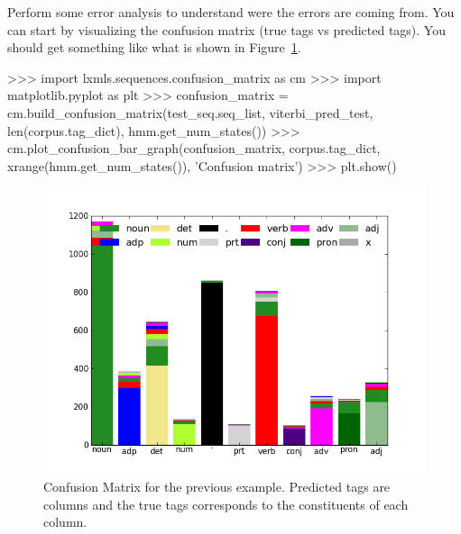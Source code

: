 \begin{exercise}
Perform some error analysis to understand were the errors are coming
from. You can start by visualizing the confusion matrix (true tags vs
predicted tags). You should get something like what is shown in Figure~\ref{fig:cmuns}.

\begin{python}
>>> import lxmls.sequences.confusion_matrix as cm
>>> import matplotlib.pyplot as plt
>>> confusion_matrix = cm.build_confusion_matrix(test_seq.seq_list, viterbi_pred_test, len(corpus.tag_dict), hmm.get_num_states())
>>> cm.plot_confusion_bar_graph(confusion_matrix, corpus.tag_dict, xrange(hmm.get_num_states()), 'Confusion matrix')
>>> plt.show()
\end{python}

\begin{figure}[h!]
\centering
\includegraphics[scale=.4]{figs/sequences/cm_sup.png}
\caption{\label{fig:cmuns} Confusion Matrix for the previous
  example. Predicted tags are columns and the true tags corresponds to
  the constituents of each column.}
\end{figure}

\end{exercise}


%
%




